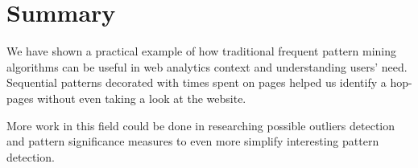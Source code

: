 \documentclass[12pt, english,a4paper]{article}
\begin{document}
\section{Summary}
We have shown a practical example of how traditional frequent pattern mining algorithms can be useful in web analytics context and understanding users' need. Sequential patterns decorated with times spent on pages helped us identify a hop-pages without even taking a look at the website.

More work in this field could be done in researching possible outliers detection and pattern significance measures to even more simplify interesting pattern detection.













\end{document}
